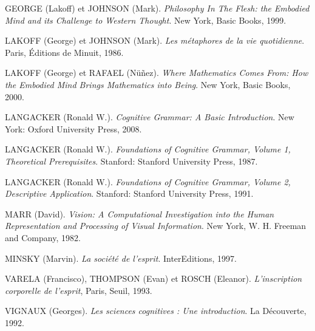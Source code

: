 GEORGE (Lakoff) et JOHNSON (Mark). \emph{Philosophy In The Flesh: the Embodied Mind and its Challenge to Western Thought}. New York, Basic Books, 1999.\par
LAKOFF (George) et JOHNSON (Mark). \emph{Les métaphores de la vie quotidienne}. Paris, Éditions de Minuit, 1986.\par
LAKOFF (George) et RAFAEL (Nüñez). \emph{Where Mathematics Comes From: How the Embodied Mind Brings Mathematics into Being}. New York, Basic Books, 2000.\par
LANGACKER (Ronald W.). \emph{Cognitive Grammar: A Basic Introduction}. New York: Oxford University Press, 2008.\par
LANGACKER (Ronald W.). \emph{Foundations of Cognitive Grammar, Volume 1, Theoretical Prerequisites}. Stanford: Stanford University Press, 1987.\par
LANGACKER (Ronald W.). \emph{Foundations of Cognitive Grammar, Volume 2, Descriptive Application}. Stanford: Stanford University Press, 1991.\par
MARR (David). \emph{Vision: A Computational Investigation into the Human Representation and Processing of Visual Information}. New York, W. H. Freeman and Company, 1982.\par
MINSKY (Marvin). \emph{La société de l’esprit}. InterEditions, 1997.\par
VARELA (Francisco), THOMPSON (Evan) et ROSCH (Eleanor). \emph{L’inscription corporelle de l’esprit}, Paris, Seuil, 1993.\par
VIGNAUX (Georges). \emph{Les sciences cognitives : Une introduction}. La Découverte, 1992.\par


\endgroup
